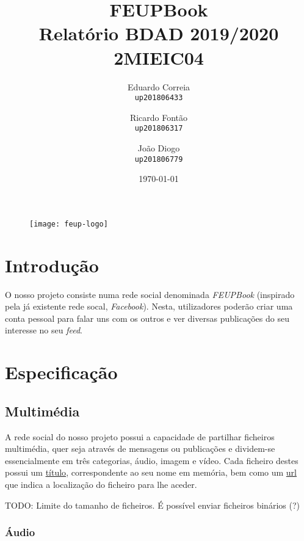 \documentclass{report}
\begin{document}
\title{\Huge{\textbf{FEUPBook}} \\ Relatório BDAD 2019/2020 \\ \Large{2MIEIC04}}
\author{Eduardo Correia \\ \texttt{up201806433} \and
	    Ricardo Fontão \\  \texttt{up201806317} \and
        João Diogo \\ \texttt{up201806779}}
\date{\today}

\begin{figure}[b] %
    \centering
    \texttt{[image: feup-logo]}
\end{figure}

\maketitle

\tableofcontents

\chapter{Introdução}

O nosso projeto consiste numa rede social denominada \textit{FEUPBook} (inspirado pela já existente rede socal,  \textit{Facebook}). Nesta, utilizadores poderão criar uma conta pessoal para falar uns com os outros e ver diversas publicações do seu interesse no seu \textit{feed}.

\chapter{Especificação} 

\section{Multimédia}

A rede social do nosso projeto possui a capacidade de partilhar ficheiros multimédia, quer seja através de mensagens ou publicações e dividem-se essencialmente em três categorias, áudio, imagem e vídeo. Cada ficheiro destes possui um \underline{título}, correspondente ao seu nome em memória, bem como um \underline{url} que indica a localização do ficheiro para lhe aceder. \par

TODO: Limite do tamanho de ficheiros. É possível enviar ficheiros binários (?)

\subsection{Áudio}
\end{document}
